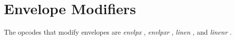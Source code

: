 \begin{comment}
\documentclass[10pt]{article}
\usepackage{fullpage, graphicx, url}
\setlength{\parskip}{1ex}
\setlength{\parindent}{0ex}
\title{Envelope Modifiers}



\begin{tabular}{ccc}
The Alternative Csound Reference Manual & & \\
Previous &Signal Modifiers &Next

\end{tabular}

\end{comment}
\section{Envelope Modifiers}


  The opcodes that modify envelopes are \emph{envlpx}
, \emph{envlpxr}
, \emph{linen}
, and \emph{linenr}
. 


\begin{comment}
\begin{tabular}{lcr}
Previous &Home &Next \\
Delay &Up &Panning and Spatialization

\end{tabular}



\end{comment}
